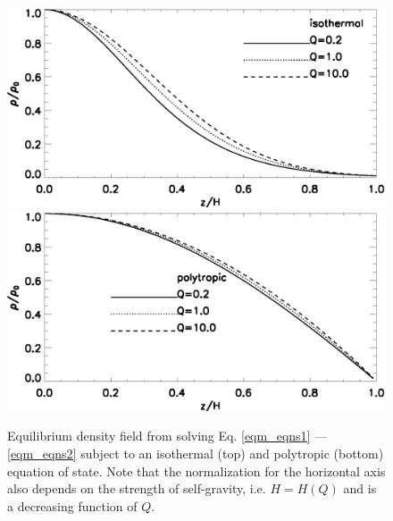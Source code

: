 \begin{figure}
  \includegraphics[width=\linewidth,clip=true,trim=0cm 1.5cm 0cm 0cm]{figures/compare_iso_density}
  \includegraphics[width=\linewidth,clip=true,trim=0cm 0cm 0cm 0.9cm]{figures/compare_poly_density}
  \caption{Equilibrium density field from solving Eq. \ref{eqm_eqns1}
    --- \ref{eqm_eqns2} subject to an isothermal (top) and polytropic
    (bottom) equation of state. Note that the normalization for the
    horizontal axis also depends on the strength of self-gravity,
    i.e. $H=H(Q)$ and is a decreasing function of $Q$. 
\label{eqm_den}}
\end{figure}


